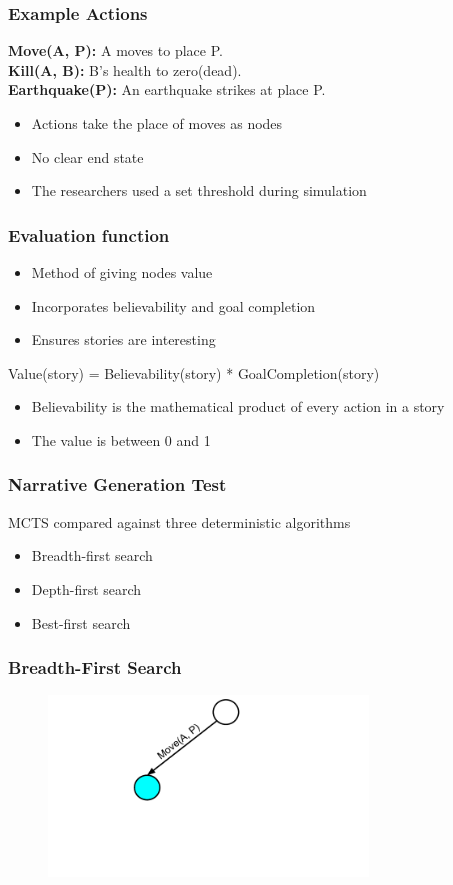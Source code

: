 \documentclass{beamer}
\begin{document}
\begin{frame}
\frametitle{Example Actions}
\textbf{Move(A, P):} A moves to place P. \\
\textbf{Kill(A, B):} B's health to zero(dead). \\
\textbf{Earthquake(P):} An earthquake strikes at place P.
\begin{itemize}
	\item Actions take the place of moves as nodes
	\item No clear end state
	\item The researchers used a set threshold during simulation
\end{itemize}
\end{frame}

\begin{frame}
\frametitle{Evaluation function}
\begin{itemize}
	\item Method of giving nodes value
	\item Incorporates believability and goal completion
	\item Ensures stories are interesting
\end{itemize}
Value(story) = Believability(story) * GoalCompletion(story) 
\begin{itemize}
	\item Believability is the mathematical product of every action in a story
	\item The value is between 0 and 1
\end{itemize}
\end{frame}

\begin{frame}
\frametitle{Narrative Generation Test}
MCTS compared against three deterministic algorithms
\begin{itemize}
	\item Breadth-first search
	\item Depth-first search
	\item Best-first search
\end{itemize}
\end{frame}

\begin{frame}[fragile]
\frametitle{Breadth-First Search}
\begin{figure}[h]
	\includegraphics[width=8.5cm]{Diagrams/BreadthFirst/BreadthTreeOne.pdf}
	\centering
\end{figure}
\end{frame}
\end{document}
